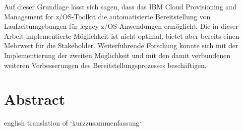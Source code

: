 Auf dieser Grundlage lässt sich sagen, dass das \glqq IBM Cloud Provisioning and Management for z/OS\grqq-Toolkit die automatisierte Bereitstellung von Laufzeitumgebungen für legacy z/OS Anwendungen ermöglicht.
Die in dieser Arbeit implementierte Möglichkeit ist nicht optimal, bietet aber bereits einen Mehrwert für die Stakeholder.
Weiterführende Forschung könnte sich mit der Implementierung der zweiten Möglichkeit und mit den damit verbundenen weiteren Verbesserungen des Bereitstellungsprozesses beschäftigen.
\section*{Abstract}
\label{sec:abstract}
english translation of `kurzzusammenfassung`


